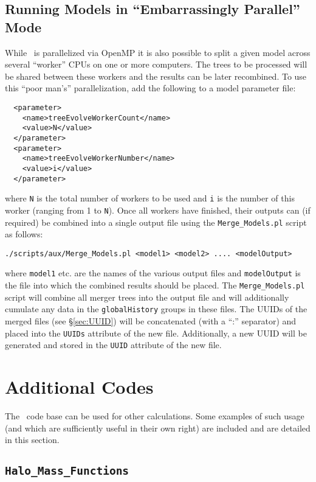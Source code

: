 \subsection{Running Models in ``Embarrassingly Parallel'' Mode}

While \glc\ is parallelized via OpenMP it is also possible to split a given model across several ``worker'' CPUs on one or more computers. The trees to be processed will be shared between these workers and the results can be later recombined. To use this ``poor man's'' parallelization, add the following to a model parameter file:
\begin{verbatim}
  <parameter>
    <name>treeEvolveWorkerCount</name>
    <value>N</value>
  </parameter>
  <parameter>
    <name>treeEvolveWorkerNumber</name>
    <value>i</value>
  </parameter>
\end{verbatim}
where {\tt N} is the total number of workers to be used and {\tt i} is the number of this worker (ranging from 1 to {\tt N}). Once all workers have finished, their outputs can (if required) be combined into a single output file using the {\tt Merge\_Models.pl} script as follows:
\begin{verbatim}
./scripts/aux/Merge_Models.pl <model1> <model2> .... <modelOutput>
\end{verbatim}
where {\tt model1} etc. are the names of the various output files and {\tt modelOutput} is the file into which the combined results should be placed. The {\tt Merge\_Models.pl} script will combine all merger trees into the output file and will additionally cumulate any data in the {\tt globalHistory} groups in these files. The UUIDs of the merged files (see \S\ref{sec:UUID}) will be concatenated (with a ``:'' separator) and placed into the {\tt UUIDs} attribute of the new file. Additionally, a new UUID will be generated and stored in the {\tt UUID} attribute of the new file.

\section{Additional Codes}

The \glc\ code base can be used for other calculations. Some examples of such usage (and which are sufficiently useful in their own right) are included and are detailed in this section.

\subsection{{\tt Halo\_Mass\_Functions}}

